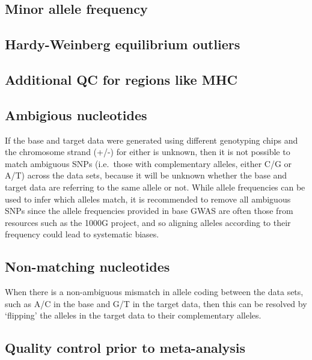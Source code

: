 \documentclass[
]{book}
\begin{document}
\hypertarget{minor-allele-frequency}{%
\subsection{Minor allele frequency}\label{minor-allele-frequency}}

\hypertarget{hardy-weinberg-equilibrium-outliers}{%
\subsection{Hardy-Weinberg equilibrium outliers}\label{hardy-weinberg-equilibrium-outliers}}

\hypertarget{additional-qc-for-regions-like-mhc}{%
\subsection{Additional QC for regions like MHC}\label{additional-qc-for-regions-like-mhc}}

\hypertarget{ambigious-nucleotides}{%
\subsection{Ambigious nucleotides}\label{ambigious-nucleotides}}

If the base and target data were generated using different genotyping chips and the chromosome strand (+/-) for either is unknown, then it is not possible to match ambiguous SNPs (i.e.~those with complementary alleles, either C/G or A/T) across the data sets, because it will be unknown whether the base and target data are referring to the same allele or not. While allele frequencies can be used to infer which alleles match, it is recommended to remove all ambiguous SNPs since the allele frequencies provided in base GWAS are often those from resources such as the 1000G project, and so aligning alleles according to their frequency could lead to systematic biases.

\hypertarget{non-matching-nucleotides}{%
\subsection{Non-matching nucleotides}\label{non-matching-nucleotides}}

When there is a non-ambiguous mismatch in allele coding between the data sets, such as A/C in the base and G/T in the target data, then this can be resolved by `flipping' the alleles in the target data to their complementary alleles.

\hypertarget{quality-control-prior-to-meta-analysis}{%
\subsection{Quality control prior to meta-analysis}\label{quality-control-prior-to-meta-analysis}}
\end{document}
